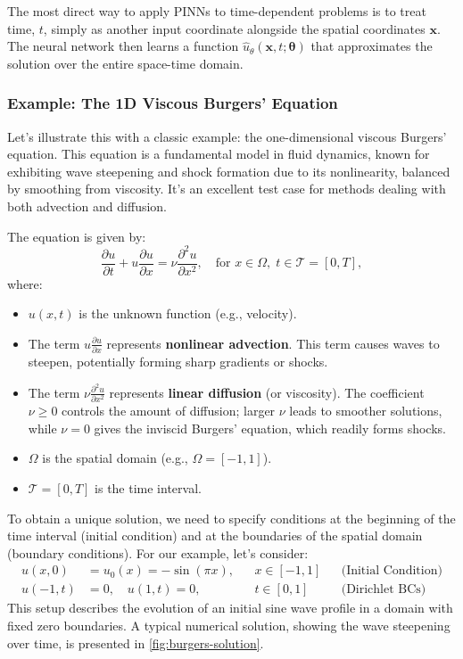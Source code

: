 The most direct way to apply PINNs to time-dependent problems is to treat time, $t$, simply as another input coordinate alongside the spatial coordinates $\mathbf{x}$. The neural network then learns a function $\hat{u}_\theta(\mathbf{x}, t; \boldsymbol{\theta})$ that approximates the solution over the entire space-time domain.

\subsubsection{Example: The 1D Viscous Burgers' Equation}

Let's illustrate this with a classic example: the one-dimensional viscous Burgers' equation. This equation is a fundamental model in fluid dynamics, known for exhibiting wave steepening and shock formation due to its nonlinearity, balanced by smoothing from viscosity. It's an excellent test case for methods dealing with both advection and diffusion.

The equation is given by:
%
\begin{equation}
    \frac{\partial u}{\partial t} + u \frac{\partial u}{\partial x} = \nu \frac{\partial^2 u}{\partial x^2}, \quad \text{for } x \in \Omega, \; t \in \mathcal{T} = [0, T],
    \label{eq:burgers_equation}
\end{equation}
%
where:
\begin{itemize}
    \item $u(x, t)$ is the unknown function (e.g., velocity).
    \item The term $u \frac{\partial u}{\partial x}$ represents \textbf{nonlinear advection}. This term causes waves to steepen, potentially forming sharp gradients or shocks.
    \item The term $\nu \frac{\partial^2 u}{\partial x^2}$ represents \textbf{linear diffusion} (or viscosity). The coefficient $\nu \ge 0$ controls the amount of diffusion; larger $\nu$ leads to smoother solutions, while $\nu=0$ gives the inviscid Burgers' equation, which readily forms shocks.
    \item $\Omega$ is the spatial domain (e.g., $\Omega = [-1, 1]$).
    \item $\mathcal{T} = [0, T]$ is the time interval.
\end{itemize}

To obtain a unique solution, we need to specify conditions at the beginning of the time interval (initial condition) and at the boundaries of the spatial domain (boundary conditions). For our example, let's consider:
%
\begin{align}
   u(x, 0) &= u_0(x) = -\sin(\pi x), && x \in [-1, 1] && \text{(Initial Condition)} \label{eq:burgers_ic} \\
   u(-1, t) &= 0, \quad u(1, t) = 0, && t \in [0, 1] && \text{(Dirichlet BCs)} \label{eq:burgers_bc}
\end{align}
%
This setup describes the evolution of an initial sine wave profile in a domain with fixed zero boundaries. A typical numerical solution, showing the wave steepening over time, is presented in \cref{fig:burgers-solution}.

